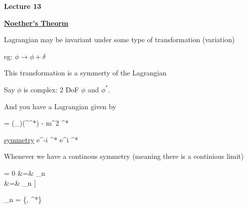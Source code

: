 \def\adagger{\ensuremath{a_{p\sigma}^\dagger}}


\usepackage{fancyhdr}

\fancyhf{}


\thispagestyle{fancy}

\begin{center}
{\huge \textbf{Lecture 13}}
\end{center}

{\fontsize{14}{16}\selectfont

\textbf{\underline{Noether's Theorm}} 

Lagrangian may be invariant under some type of transformation (variation) 

eg: $\phi \rightarrow \phi + \delta$

This transformation is a symmerty of the Lagrangian

Say $\phi$ is complex:  2 DoF  $\phi$ and $\phi^*$.

And you have a Lagrangian given by


\be
{} = (\partial_\mu \phi)(\partial^\mu \phi^*) - m^2 \phi \phi^*
\ee

\underline{symmetry}
\be
\phi \rightarrow e^{-i\alpha} \phi \hspace{1in} \phi^* \rightarrow e^{i\alpha} \phi^*
\ee


Whenever we have a continous symmetry (meaning there is a continious limit)

\bea
{} = 0 &=& \sum_n   \\ 
&=& \sum_n \left[ \underbrace{\left[ \frac{\partial \mathcal{L}}{\partial \phi_n} - \partial_\mu \frac{\partial \mathcal{L}}{\partial (\partial_\mu \phi_n)} \right]}_{=0\ \textrm{Euler Lagrange}} \frac{\delta \phi_n}{\delta \alpha}  +  \partial_\mu \left[ \frac{\partial \mathcal{L}}{\partial (\partial_\mu \phi_n)} \frac{\delta \phi_n}{\delta \alpha} \right] \right]
\eea

\be
\phi_n = \{\phi, \phi^*\}
\ee

}
